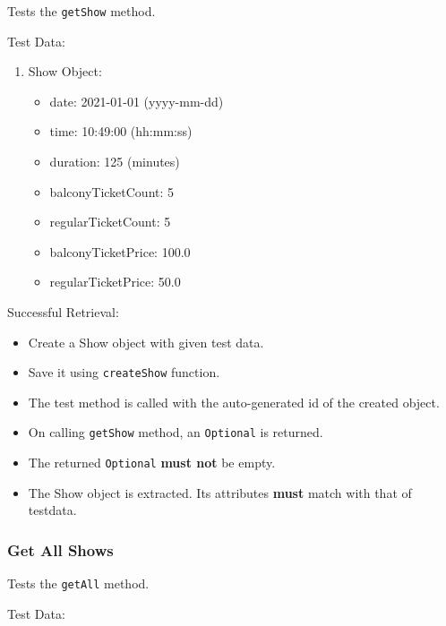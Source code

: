 \documentclass[]{article}
\providecommand{\tightlist}{%
  \setlength{\itemsep}{0pt}\setlength{\parskip}{0pt}}
\begin{document}
Tests the \texttt{getShow} method.

Test Data:

\begin{enumerate}
\def\labelenumi{\arabic{enumi}.}
\tightlist
\item
  Show Object:

  \begin{itemize}
  \tightlist
  \item
    date: 2021-01-01 (yyyy-mm-dd)
  \item
    time: 10:49:00 (hh:mm:ss)
  \item
    duration: 125 (minutes)
  \item
    balconyTicketCount: 5
  \item
    regularTicketCount: 5
  \item
    balconyTicketPrice: 100.0
  \item
    regularTicketPrice: 50.0
  \end{itemize}
\end{enumerate}

Successful Retrieval:

\begin{itemize}
\tightlist
\item
  Create a Show object with given test data.
\item
  Save it using \texttt{createShow} function.
\item
  The test method is called with the auto-generated id of the created
  object.
\item
  On calling \texttt{getShow} method, an \texttt{Optional} is returned.
\item
  The returned \texttt{Optional} \textbf{must not} be empty.
\item
  The Show object is extracted. Its attributes \textbf{must} match with
  that of testdata.
\end{itemize}

\hypertarget{get-all-shows}{%
\subsubsection{Get All Shows}\label{get-all-shows}}

Tests the \texttt{getAll} method.

Test Data:
\end{document}
